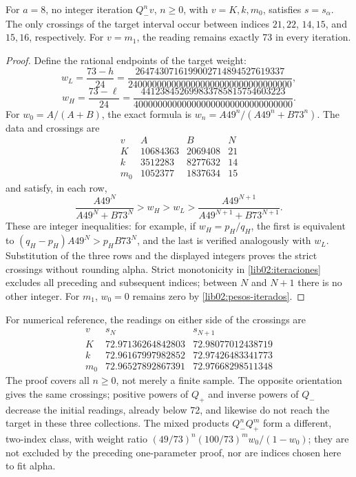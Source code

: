 \begin{proposition}
\label{lib02:cruces-enteros}
For \(a=8\), no integer iteration \(Q_-^nv\), \(n\geq0\), with \(v=K,k,m_0\), satisfies \(s=s_\alpha\). The only crossings of the target interval occur between indices \(21,22\), \(14,15\), and \(15,16\), respectively. For \(v=m_1\), the reading remains exactly 73 in every iteration.
\end{proposition}
\begin{proof}
Define the rational endpoints of the target weight:
\[
 w_L=\frac{73-h}{24}
 =\frac{2647430716199002714894527619337}
 {2400000000000000000000000000000000},
\]
\[
 w_H=\frac{73-\ell}{24}
 =\frac{441238452699833785815754603223}
 {400000000000000000000000000000000}.
\]
For \(w_0=A/(A+B)\), the exact formula is \(w_n=A49^n/(A49^n+B73^n)\). The data and crossings are
\[
\begin{array}{c|r|r|c}
 v&A&B&N\\\hline
 K&10684363&2069408&21\\
 k&3512283&8277632&14\\
 m_0&1052377&1837634&15
\end{array}
\]
and satisfy, in each row,
\[
 \frac{A49^N}{A49^N+B73^N}>w_H>w_L>
 \frac{A49^{N+1}}{A49^{N+1}+B73^{N+1}}.
\]
These are integer inequalities: for example, if \(w_H=p_H/q_H\), the first is equivalent to \((q_H-p_H)A49^N>p_HB73^N\), and the last is verified analogously with \(w_L\). Substitution of the three rows and the displayed integers proves the strict crossings without rounding alpha. Strict monotonicity in \cref{lib02:iteraciones} excludes all preceding and subsequent indices; between \(N\) and \(N+1\) there is no other integer. For \(m_1\), \(w_0=0\) remains zero by \eqref{lib02:pesos-iterados}.
\end{proof}

For numerical reference, the readings on either side of the crossings are
\[
\begin{array}{c|c|c}
 v&s_N&s_{N+1}\\\hline
 K&72.97136264842803&72.98077012438719\\
 k&72.96167997982852&72.97426483341773\\
 m_0&72.96527892867391&72.97668298511348
\end{array}
\]
The proof covers all \(n\geq0\), not merely a finite sample. The opposite orientation gives the same crossings; positive powers of \(Q_+\) and inverse powers of \(Q_-\) decrease the initial readings, already below 72, and likewise do not reach the target in these three collections. The mixed products \(Q_-^nQ_+^m\) form a different, two-index class, with weight ratio \((49/73)^n(100/73)^m w_0/(1-w_0)\); they are not excluded by the preceding one-parameter proof, nor are indices chosen here to fit alpha.

